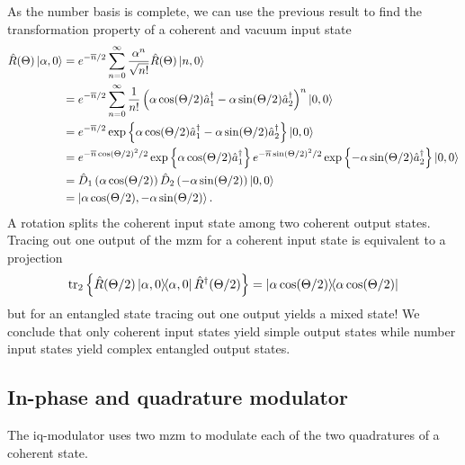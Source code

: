 As the number basis is complete, we can use the previous result to find the transformation property of a coherent and vacuum input state
\begin{equation}
	\begin{split}
		\hat{R}(\Theta)
		\ket{\alpha,0}
		&=
		e^{-\overline{n}/2}
		\sum_{n=0}^\infty
		\frac{\alpha^n}{\sqrt{n!}}
		\hat{R}(\Theta)
		\ket{n,0}
		\\
		&=
		e^{-\overline{n}/2}
		\sum_{n=0}^\infty
		\frac{1}{n!}
		\left(
			\alpha
			\cos(\Theta/2)
			\hat{a}_1^\dagger
			-
			\alpha
			\sin(\Theta/2)
			\hat{a}_2^\dagger
		\right)^n
		\ket{0,0}
		\\
		&=
		e^{-\overline{n}/2}
		\exp\left\{
			\alpha
			\cos(\Theta/2)
			\hat{a}_1^\dagger
			-
			\alpha
			\sin(\Theta/2)
			\hat{a}_2^\dagger
		\right\}
		\ket{0,0}
		\\
		&=
		e^{-\overline{n}\cos(\Theta/2)^2/2}
		\exp\left\{
			\alpha
			\cos(\Theta/2)
			\hat{a}_1^\dagger
		\right\}
		e^{-\overline{n}\sin(\Theta/2)^2/2}
		\exp\left\{
			-
			\alpha
			\sin(\Theta/2)
			\hat{a}_2^\dagger
		\right\}
		\ket{0,0}
		\\
		&=
		\hat{D}_1\left(
			\alpha
			\cos(\Theta/2)
		\right)
		\hat{D}_2\left(
			-
			\alpha
			\sin(\Theta/2)
		\right)
		\ket{0,0}
		\\
		&=
		\ket{\alpha\cos(\Theta/2),-\alpha\sin(\Theta/2)}
		.
	\end{split}
\end{equation}
A rotation splits the coherent input state among two coherent output states.
Tracing out one output of the \gls{mzm} for a coherent input state is equivalent to a projection
\begin{equation}
	\tr_2\left\{
		\hat{R}(\Theta/2)
		\ketbra{\alpha,0}
		\hat{R}^\dagger(\Theta/2)
	\right\}
	=
	\ketbra{\alpha\cos(\Theta/2)}
\end{equation}
but for an entangled state tracing out one output yields a mixed state!
We conclude that only coherent input states yield simple output states while number input states yield complex entangled output states.

\subsection{In-phase and quadrature modulator}

The \gls{iq}-modulator uses two \gls{mzm} to modulate each of the two quadratures of a coherent state.

